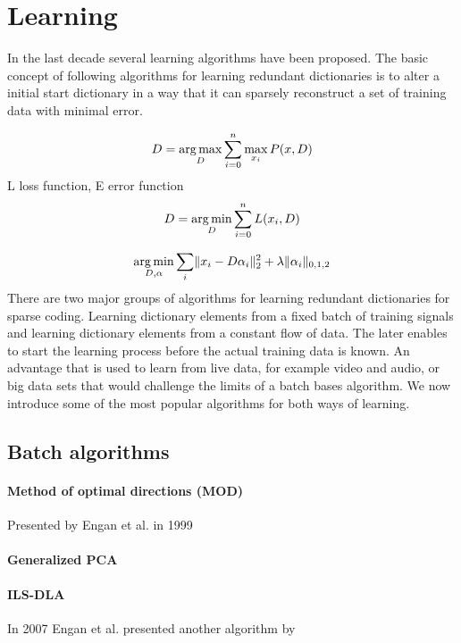\section{Learning}
\cite{Olshausen1997,Lewicki2000,Aharon2006}
In the last decade several learning algorithms have been proposed. The basic
concept of following algorithms for learning redundant dictionaries is to alter
a initial start dictionary in a way that it can sparsely reconstruct a set of
training data with minimal error. 

\begin{align} 
D = \operatorname*{arg\,max}_{D} \sum_{i=0}^n \max_{x_i} P(x,D)
\end{align}
L loss function, E error function
\begin{align} 
D = \operatorname*{arg\,min}_{D} \sum_{i=0}^n L(x_i,D)
\end{align}

\begin{align} 
\operatorname*{arg\,min}_{D,\alpha} \sum_{i}
\lVert x_i - D\alpha_i \rVert^{2}_{2}  +  \lambda \lVert \alpha_i
\rVert_{0,1,2}
\end{align}
There are two major groups of algorithms for learning redundant dictionaries for
sparse coding. Learning dictionary elements from a fixed batch of training
signals and learning dictionary elements from a constant flow of data. The later
enables to start the learning process before the actual training data is known.
An advantage that is used to learn from live data, for example video and audio,
or big data sets that would challenge the limits of a batch bases algorithm. We
now introduce some of the most popular algorithms for both ways of learning.

\subsection{Batch algorithms}
\paragraph{Method of optimal directions (MOD)}
Presented by Engan et al. in 1999\cite{Engan1999a} 
\paragraph{Generalized PCA}
\cite{?}
\paragraph{ILS-DLA}
In 2007 Engan et al.\cite{Engan2007} presented another algorithm by   


